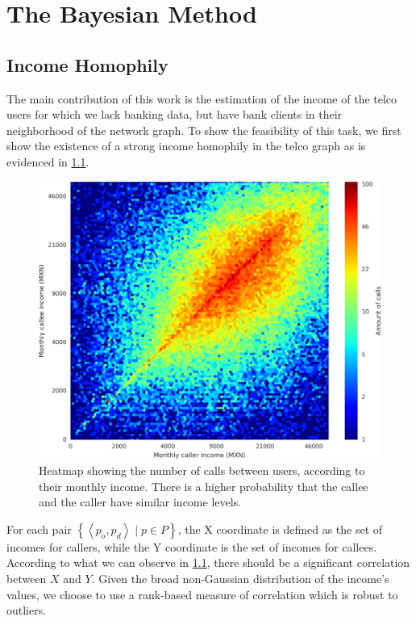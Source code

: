 
\chapter{The Bayesian Method}
\label{sec:inference_methodology}

\section{Income Homophily}
\label{subsec:income_homophily}

The main contribution of this work is the estimation of the income of the telco users for which we lack banking data, but have bank clients in their neighborhood of the network graph. To show the feasibility of this task, we first show the existence of a strong income homophily in the telco graph as is evidenced in \cref{fig:homophily_heatmap}.

\begin{figure}
\centering
\includegraphics[width=\textwidth]{figures/Homophily_income_origin_target_1/Homophily_income_origin_target_1.png}
\caption{Heatmap showing the number of calls between users, according to their monthly income. There is a higher probability that the callee and the caller have similar income levels.}
\label{fig:homophily_heatmap}
\end{figure}

For each pair $\left\{ \left< p_o, p_d \right> \mid p \in P \right\}$, the X coordinate is defined as the set of incomes for callers, while the Y coordinate is the set of incomes for callees. According to what we can observe in \cref{fig:homophily_heatmap}, there should be a significant correlation between $X$ and $Y$. Given the broad non-Gaussian distribution of the income's values, we choose to use a rank-based measure of correlation which is robust to outliers.

